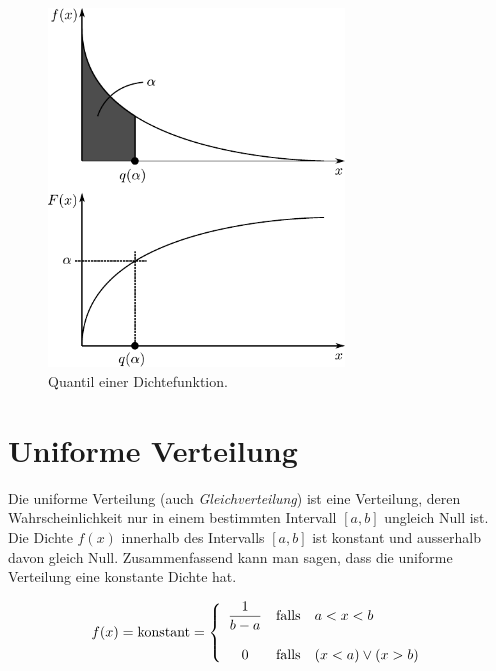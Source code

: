 \begin{figure}[h!]
	\centering
	\includegraphics[width=0.7\textwidth]{dichtefunktion-quantile.pdf}
	\caption{Quantil einer Dichtefunktion.}
	\label{fig:dichte-quantil}
\end{figure}

\clearpage
\newpage
\section{Uniforme Verteilung}

Die uniforme Verteilung (auch \emph{Gleichverteilung}) ist eine
Verteilung, deren Wahrscheinlichkeit nur in einem bestimmten 
Intervall $[a,b]$ ungleich Null ist. Die Dichte $f(x)$ innerhalb 
des Intervalls $[a,b]$ ist konstant und ausserhalb davon gleich Null.
Zusammenfassend kann man sagen, dass die uniforme Verteilung eine
konstante Dichte hat.

\[  
	f(x) = \mathrm{konstant} = \left\{\begin{array}{c c l}
		\displaystyle \frac{1}{b-a}
			& \text{falls}
			& a < x < b \\
		& & \\
		0
			& \text{falls}
			& (x < a) \lor (x > b)
		\end{array} \right.
\]

